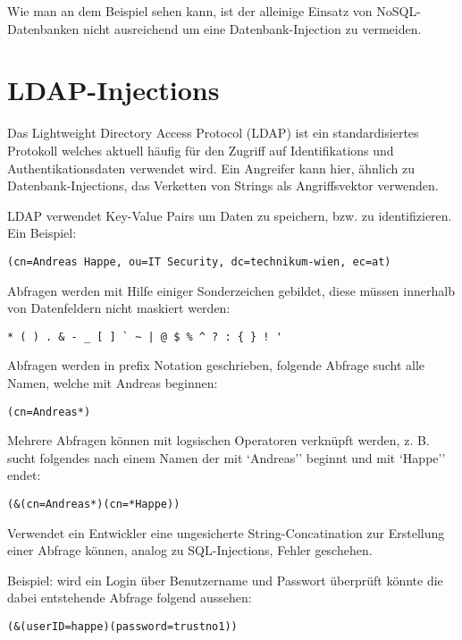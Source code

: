 Wie man an dem Beispiel sehen kann, ist der alleinige Einsatz von NoSQL-Datenbanken nicht ausreichend um eine Datenbank-Injection zu vermeiden.

\section{LDAP-Injections}

Das Lightweight Directory Access Protocol (LDAP) ist ein standardisiertes Protokoll welches aktuell häufig für den Zugriff auf Identifikations und Authentikationsdaten verwendet wird. Ein Angreifer kann hier, ähnlich zu Datenbank-Injections, das Verketten von Strings als Angriffsvektor verwenden.

LDAP verwendet Key-Value Pairs um Daten zu speichern, bzw. zu identifizieren. Ein Beispiel:

\begin{verbatim}
(cn=Andreas Happe, ou=IT Security, dc=technikum-wien, ec=at)
\end{verbatim}

Abfragen werden mit Hilfe einiger Sonderzeichen gebildet, diese müssen innerhalb von Datenfeldern nicht maskiert werden:

\begin{verbatim}
* ( ) . & - _ [ ] ` ~ | @ $ % ^ ? : { } ! '
\end{verbatim}

Abfragen werden in prefix Notation geschrieben, folgende Abfrage sucht alle Namen, welche mit Andreas beginnen:

\begin{verbatim}
(cn=Andreas*)
\end{verbatim}

Mehrere Abfragen können mit logsischen Operatoren verknüpft werden, z. B. sucht folgendes nach einem Namen der mit `Andreas'' beginnt und mit `Happe'' endet:

\begin{verbatim}
(&(cn=Andreas*)(cn=*Happe))
\end{verbatim}

Verwendet ein Entwickler eine ungesicherte String-Concatination zur Erstellung einer Abfrage können, analog zu SQL-Injections, Fehler geschehen.

Beispiel: wird ein Login über Benutzername und Passwort überprüft könnte die dabei entstehende Abfrage folgend aussehen:

\begin{verbatim}
(&(userID=happe)(password=trustno1))
\end{verbatim}

